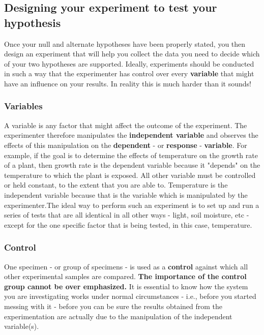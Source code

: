 \documentclass[
]{book}
\begin{document}
\hypertarget{designing-your-experiment-to-test-your-hypothesis}{%
\subsection*{Designing your experiment to test your hypothesis}\label{designing-your-experiment-to-test-your-hypothesis}}

Once your null and alternate hypotheses have been properly stated, you then design an experiment that will help you collect the data you need to decide which of your two hypotheses are supported. Ideally, experiments should be conducted in such a way that the experimenter has control over every \textbf{variable} that might have an influence on your results. In reality this is much harder than it sounds!

\hypertarget{variables}{%
\subsubsection*{Variables}\label{variables}}

A variable is any factor that might affect the outcome of the experiment. The experimenter therefore manipulates the \textbf{independent variable} and observes the effects of this manipulation on the \textbf{dependent} - or \textbf{response} - \textbf{variable}. For example, if the goal is to determine the effects of temperature on the growth rate of a plant, then growth rate is the dependent variable because it "depends" on the temperature to which the plant is exposed. All other variable must be controlled or held constant, to the extent that you are able to. Temperature is the independent variable because that is the variable which is manipulated by the experimenter.The ideal way to perform such an experiment is to set up and run a series of tests that are all identical in all other ways - light, soil moisture, etc - except for the one specific factor that is being tested, in this case, temperature.

\hypertarget{control}{%
\subsubsection*{Control}\label{control}}

One specimen - or group of specimens - is used as a \textbf{control} against which all other experimental samples are compared. \textbf{The importance of the control group cannot be over emphasized.} It is essential to know how the system you are investigating works under normal circumstances - i.e., before you started messing with it - before you can be sure the results obtained from the experimentation are actually due to the manipulation of the independent variable(s).
\end{document}

